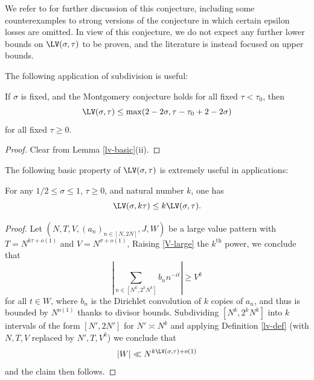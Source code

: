 
We refer to \cite{bourgain_montgomery_1991} for further discussion of this conjecture, including some counterexamples to strong versions of the conjecture in which certain epsilon losses are omitted.  In view of this conjecture, we do not expect any further lower bounds on $\LV(\sigma,\tau)$ to be proven, and the literature is instead focused on upper bounds.

The following application of subdivision is useful:

\begin{lemma}\label{montgomery-subdivide}  If $\sigma$ is fixed, and the Montgomery conjecture holds for all fixed $\tau < \tau_0$, then
\begin{equation}\label{lvt-opt}
    \LV(\sigma, \tau) \leq \max( 2 - 2 \sigma, \tau - \tau_0 + 2 - 2\sigma)
\end{equation}
for all fixed $\tau \geq 0$.
\end{lemma}

\begin{proof}
Clear from Lemma \ref{lv-basic}(ii).
\end{proof}


The following basic property of $\LV(\sigma,\tau)$ is extremely useful in applications:

\begin{lemma}\label{power-lemma}  For any $1/2 \leq \sigma \leq 1$, $\tau \geq 0$, and natural number $k$, one has
    $$ \LV(\sigma, k\tau) \leq k \LV(\sigma, \tau).$$
\end{lemma}


\begin{proof} Let  $(N,T,V,(a_n)_{n \in [N,2N]},J,W)$ be a large value pattern with $T = N^{k\tau+o(1)}$ and $V = N^{\sigma+o(1)}$, Raising \eqref{V-large} the $k^{\mathrm{th}}$ power, we conclude that
$$ \left|\sum_{n \in [N^k,2^kN^k]} b_n n^{-it} \right| \geq V^k$$
for all $t \in W$, where $b_n$ is the Dirichlet convolution of $k$ copies of $a_n$, and thus is bounded by $N^{o(1)}$ thanks to divisor bounds.  Subdividing $[N^k, 2^k N^k]$ into $k$ intervals of the form $[N',2N']$ for $N' \asymp N^k$ and applying Definition \ref{lv-def} (with $N, T, V$ replaced by $N', T, V^k$) we conclude that
$$ |W| \ll N^{k \LV(\sigma,\tau) + o(1)}$$
and the claim then follows.
\end{proof}

